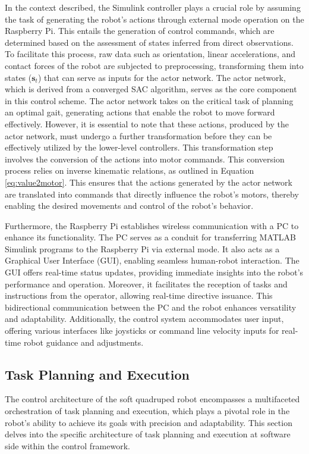 In the context described, the Simulink controller plays a crucial role by assuming the task of generating the robot's actions through external mode operation on the Raspberry Pi. This entails the generation of control commands, which are determined based on the assessment of states inferred from direct observations. To facilitate this process, raw data such as orientation, linear accelerations, and contact forces of the robot are subjected to preprocessing, transforming them into states ($\mathbf{s}_t$) that can serve as inputs for the actor network. The actor network, which is derived from a converged SAC algorithm, serves as the core component in this control scheme. The actor network takes on the critical task of planning an optimal gait, generating actions that enable the robot to move forward effectively. However, it is essential to note that these actions, produced by the actor network, must undergo a further transformation before they can be effectively utilized by the lower-level controllers. This transformation step involves the conversion of the actions into motor commands. This conversion process relies on inverse kinematic relations, as outlined in Equation \ref{eq:value2motor}. This ensures that the actions generated by the actor network are translated into commands that directly influence the robot's motors, thereby enabling the desired movements and control of the robot's behavior.

Furthermore, the Raspberry Pi establishes wireless communication with a PC to enhance its functionality. The PC serves as a conduit for transferring MATLAB Simulink programs to the Raspberry Pi via external mode. It also acts as a Graphical User Interface (GUI), enabling seamless human-robot interaction. The GUI offers real-time status updates, providing immediate insights into the robot's performance and operation. Moreover, it facilitates the reception of tasks and instructions from the operator, allowing real-time directive issuance. This bidirectional communication between the PC and the robot enhances versatility and adaptability. Additionally, the control system accommodates user input, offering various interfaces like joysticks or command line velocity inputs for real-time robot guidance and adjustments.

\subsection{Task Planning and Execution}
The control architecture of the soft quadruped robot encompasses a multifaceted orchestration of task planning and execution, which plays a pivotal role in the robot's ability to achieve its goals with precision and adaptability. This section delves into the specific architecture of task planning and execution at software side within the control framework. 

